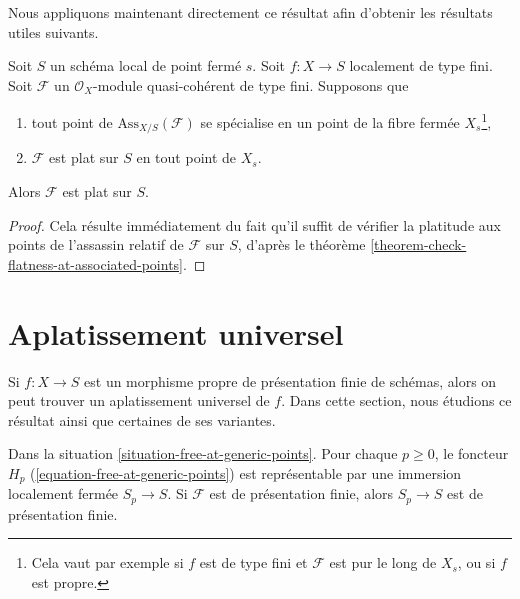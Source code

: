 \noindent
Nous appliquons maintenant directement ce résultat afin d'obtenir les résultats utiles suivants.

\begin{lemma}
\label{lemma-check-along-closed-fibre}
Soit $S$ un schéma local de point fermé $s$.
Soit $f : X \to S$ localement de type fini.
Soit $\mathcal{F}$ un $\mathcal{O}_X$-module quasi-cohérent de type fini.
Supposons que
\begin{enumerate}
\item tout point de $\text{Ass}_{X/S}(\mathcal{F})$ se spécialise
en un point de la fibre fermée $X_s$\footnote{Cela vaut par exemple si
$f$ est de type fini et $\mathcal{F}$ est pur le long de $X_s$, ou
si $f$ est propre.},
\item $\mathcal{F}$ est plat sur $S$ en tout point de $X_s$.
\end{enumerate}
Alors $\mathcal{F}$ est plat sur $S$.
\end{lemma}

\begin{proof}
Cela résulte immédiatement du fait qu'il suffit de vérifier la
platitude aux points de l'assassin relatif de $\mathcal{F}$
sur $S$, d'après le
théorème \ref{theorem-check-flatness-at-associated-points}.
\end{proof}











\section{Aplatissement universel}
\label{section-flattening-final}

\noindent
Si $f : X \to S$ est un morphisme propre de présentation finie
de schémas, alors on peut trouver un aplatissement universel de $f$.
Dans cette section, nous étudions ce résultat ainsi que certaines de ses variantes.

\begin{lemma}
\label{lemma-free-at-generic-points-representable}
Dans la situation \ref{situation-free-at-generic-points}.
Pour chaque $p \geq 0$, le foncteur $H_p$
(\ref{equation-free-at-generic-points}) est représentable
par une immersion localement fermée $S_p \to S$. Si $\mathcal{F}$
est de présentation finie, alors $S_p \to S$ est de présentation finie.
\end{lemma}

